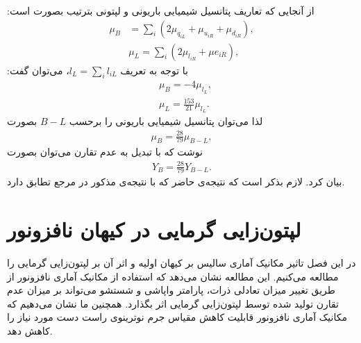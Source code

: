 \documentclass[a4paper]{book}
\begin{document}
از آنجایی که تعاریف پتانسیل شیمیایی باریونی و لپتونی بترتیب بصورت است:
{\footnotesize\begin{align}
	\mu_B&=\sum_i \left(2\mu_{q_{iL}}+\mu_{u_{iR}}+\mu_{d_{iR}}\right),\\
	&\mu_L=\sum_i \left(2\mu_{l_{iR}}+\mu{e_{iR}}\right),
\end{align}}
با توجه به تعریف {\footnotesize$l_L = \sum_i l_{iL}$}، می‌توان گفت:
{\footnotesize\begin{align}
	&\mu_B=-4 \mu_{l_{L}},\\
	&\mu_L=\frac{153}{21} \mu_{l_{L}}.
\end{align}}
لذا می‌توان پتانسیل شیمیایی باریونی را برحسب {\footnotesize$B-L$} بصورت 
{\footnotesize\begin{align}
	\mu_B = \frac{28}{79} \mu_{B-L},
	\label{eq:muBLtomuB}
\end{align}}
نوشت که با تبدیل به عدم تقارن می‌توان بصورت
{\footnotesize\begin{align}
	Y_B = \frac{28}{79} Y_{B-L}.
	\label{eq:YBLtoYB}
\end{align}}
بیان کرد. لازم بذکر است که نتیجه‌ی حاضر که با نتیجه‌ی مذکور در مرجع \cite{Luty:1992un} تطابق دارد.

\chapter{لپتون‌زایی گرمایی در کیهان نافزونور}
\label{chap:nonextensive}
در این فصل تاثیر مکانیک آماری سالیس بر کیهان اولیه و اثر آن بر لپتون‌زایی گرمایی را مطالعه می‌کنیم. این مطالعه نشان می‌دهد که استفاده از مکانیک آماری نافزونور از طریق تغییر میزان تعادلی ذرات، پارامتر واپاشی و شستشو می‌تواند بر میزان عدم تقارن تولید شده توسط لپتون‌زایی گرمایی اثر بگذارد. همچنین ما نشان می‌دهیم که مکانیک آماری نافزونور قابلیت کاهش مقیاس جرم نوترینوی راست دست مورد نیاز را کاهش دهد.
\end{document}
